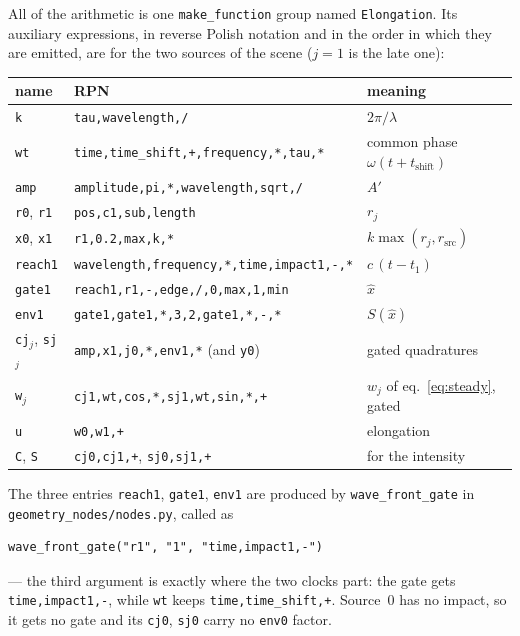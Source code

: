 \documentclass[11pt,a4paper]{article}
\newcommand{\node}[1]{\texttt{#1}}
\begin{document}
All of the arithmetic is one \node{make\_function} group named
\node{Elongation}. Its auxiliary expressions, in reverse Polish notation and in
the order in which they are emitted, are for the two sources of the scene
($j=1$ is the late one):

\begin{center}
\small
\begin{tabular}{@{}lll@{}}
\toprule
name & RPN & meaning\\
\midrule
\node{k}      & \verb|tau,wavelength,/|                       & $2\pi/\lambda$\\
\node{wt}     & \verb|time,time_shift,+,frequency,*,tau,*|    & common phase $\omega(t+t_\text{shift})$\\
\node{amp}    & \verb|amplitude,pi,*,wavelength,sqrt,/|       & $A'$\\
\node{r0}, \node{r1} & \verb|pos,c1,sub,length|               & $r_j$\\
\node{x0}, \node{x1} & \verb|r1,0.2,max,k,*|                  & $k\max(r_j,r_\text{src})$\\
\node{reach1} & \verb|wavelength,frequency,*,time,impact1,-,*| & $c\,(t-t_1)$\\
\node{gate1}  & \verb|reach1,r1,-,edge,/,0,max,1,min|         & $\hat x$\\
\node{env1}   & \verb|gate1,gate1,*,3,2,gate1,*,-,*|          & $S(\hat x)$\\
\node{cj$_j$}, \node{sj$_j$} & \verb|amp,x1,j0,*,env1,*| (and \verb|y0|) & gated quadratures\\
\node{w$_j$}  & \verb|cj1,wt,cos,*,sj1,wt,sin,*,+|            & $w_j$ of eq.~\eqref{eq:steady}, gated\\
\node{u}      & \verb|w0,w1,+|                                & elongation\\
\node{C}, \node{S} & \verb|cj0,cj1,+|, \verb|sj0,sj1,+|       & for the intensity\\
\bottomrule
\end{tabular}
\end{center}

The three entries \node{reach1}, \node{gate1}, \node{env1} are produced by
\node{wave\_front\_gate} in \node{geometry\_nodes/nodes.py}, called as
\begin{verbatim}
wave_front_gate("r1", "1", "time,impact1,-")
\end{verbatim}
--- the third argument is exactly where the two clocks part: the gate gets
\verb|time,impact1,-|, while \node{wt} keeps \verb|time,time_shift,+|.
Source~0 has no impact, so it gets no gate and its \node{cj0}, \node{sj0}
carry no \verb|env0| factor.
\end{document}

